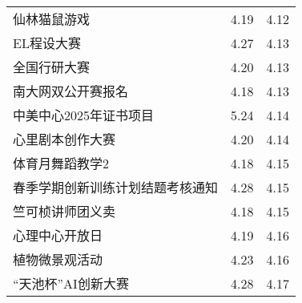 \documentclass[letterpaper, 12pt]{article}
\begin{document}
\begin{multicols}{2}
{\begin{longtable}{|>{\centering\arraybackslash}m{}|m{}|m{}|}
    仙林猫鼠游戏 & 4.19 & 4.12\\
    EL程设大赛 & 4.27 & 4.13\\
    全国行研大赛 & 4.20 & 4.13\\
    南大网双公开赛报名 & 4.18 & 4.13\\
    中美中心2025年证书项目 & 5.24 & 4.14\\
    心里剧本创作大赛 & 4.20 & 4.14\\
    体育月舞蹈教学2 & 4.18 & 4.15\\
    春季学期创新训练计划结题考核通知 & 4.28 & 4.15\\
    竺可桢讲师团义卖 & 4.18 & 4.15\\
    心理中心开放日 & 4.19 & 4.16\\
    植物微景观活动 & 4.23 & 4.16\\
    “天池杯”AI创新大赛 & 4.28 & 4.17\\
    
    \hline
\end{longtable}
\unskip
\unpenalty
\unpenalty}\unvbox\colbbox
\end{multicols}
\end{document}

